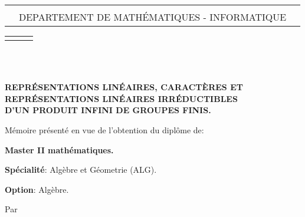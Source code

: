 \documentclass[a4paper, 14pt]{report}
\begin{document}
\begin{center}
\begin{tabularx}{\textwidth}{>{\centering}XcX<{\centering}}

         & & \\
          & DEPARTEMENT DE MATHÉMATIQUES - INFORMATIQUE & \\
 
\end{tabularx}
\end{center}
\begin{tabularx}{\textwidth}{>{\centering}XcX<{\centering}}
        & & \\
           
\end{tabularx}\\
\begin{center}

\begin{tcolorbox}[
	colframe=blue!70,      %
	colback=blue!10,       %
	coltitle=black,        %
	boxrule=1mm,         %
	arc=5mm,               %
	width=\textwidth ,      %
	center                 %
	]
	\centering
	
	{\textbf{\large \\
			 REPRÉSENTATIONS LINÉAIRES, CARACTÈRES ET \\
			REPRÉSENTATIONS LINÉAIRES IRRÉDUCTIBLES \\
			D'UN PRODUIT INFINI DE GROUPES FINIS.\\ }}
\end{tcolorbox}




{\fontsize{12}{10}\selectfont

\vspace{0.5cm}
Mémoire présenté en vue de l’obtention du diplôme de:
\begin{center}
	\textbf{Master II mathématiques.}
\end{center}

\textbf{Spécialité}: Algèbre et Géometrie (ALG).

\begin{center}
\textbf{Option}: Algèbre.
\end{center}

\begin{center}
Par
\end{center}

}
\end{center}
\end{document}
